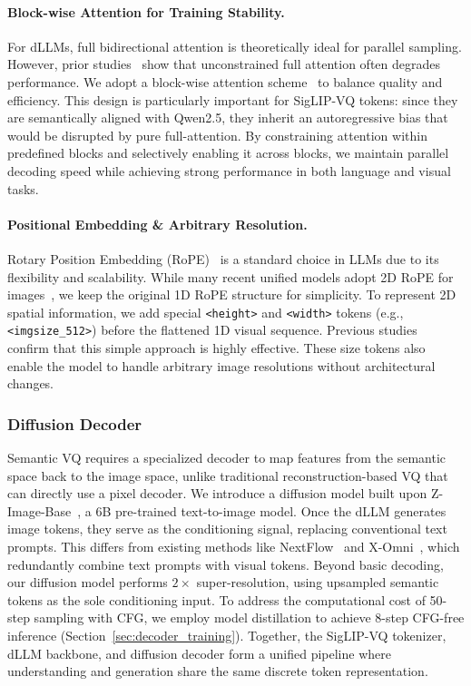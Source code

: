 \paragraph{Block-wise Attention for Training Stability.}
For dLLMs, full bidirectional attention is theoretically ideal for parallel sampling.
%
However, prior studies~\citep{LLaDA,Mmada,dimoo} show that unconstrained full attention often degrades performance.
%
We adopt a block-wise attention scheme~\citep{arriola2025block} to balance quality and efficiency.
%
This design is particularly important for SigLIP-VQ tokens: since they are semantically aligned with Qwen2.5, they inherit an autoregressive bias that would be disrupted by pure full-attention.
%
By constraining attention within predefined blocks and selectively enabling it across blocks, we maintain parallel decoding speed while achieving strong performance in both language and visual tasks.

\paragraph{Positional Embedding \& Arbitrary Resolution.} 
Rotary Position Embedding (RoPE)~\citep{su2021roformer} is a standard choice in LLMs due to its flexibility and scalability. 
%
While many recent unified models adopt 2D RoPE for images~\citep{cao2025hunyuanimage,bagel}, we keep the original 1D RoPE structure for simplicity.
%
To represent 2D spatial information, we add special \texttt{<height>} and \texttt{<width>} tokens (e.g., \texttt{<imgsize\_512>}) before the flattened 1D visual sequence.
%
Previous studies~\citep{liu2026lumina,xin2025lumina,xomni} confirm that this simple approach is highly effective.
%
These size tokens also enable the model to handle arbitrary image resolutions without architectural changes.


\subsubsection{Diffusion Decoder}
\label{sec:diffusion_decoder}
Semantic VQ requires a specialized decoder to map features from the semantic space back to the image space, unlike traditional reconstruction-based VQ that can directly use a pixel decoder.
%
We introduce a diffusion model built upon Z-Image-Base~\citep{cai2025z}, a 6B pre-trained text-to-image model.
%
Once the dLLM generates image tokens, they serve as the conditioning signal, replacing conventional text prompts.
%
This differs from existing methods like NextFlow~\citep{zhang2026nextflow} and X-Omni~\citep{xomni}, which redundantly combine text prompts with visual tokens.
%
Beyond basic decoding, our diffusion model performs $2\times$ super-resolution, using upsampled semantic tokens as the sole conditioning input.
%
To address the computational cost of 50-step sampling with CFG, we employ model distillation to achieve 8-step CFG-free inference (Section~\ref{sec:decoder_training}).
%
Together, the SigLIP-VQ tokenizer, dLLM backbone, and diffusion decoder form a unified pipeline where understanding and generation share the same discrete token representation.



